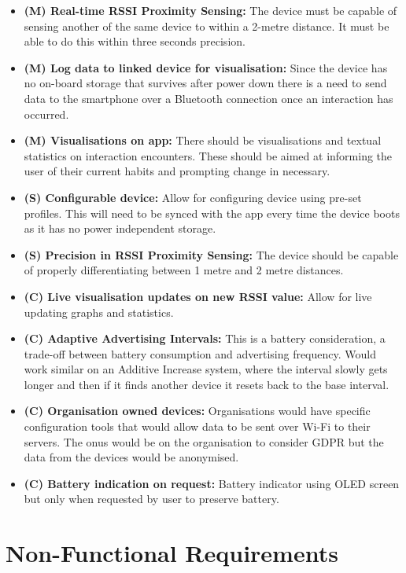 \documentclass{l4proj}
\begin{document}
\begin{itemize}
    \item \textbf{(M) Real-time RSSI Proximity Sensing: } The device must be capable of sensing another of the same device to within a 2-metre distance. It must be able to do this within three seconds precision.
    \item \textbf{(M) Log data to linked device for visualisation: } Since the device has no on-board storage that survives after power down there is a need to send data to the smartphone over a Bluetooth connection once an interaction has occurred.
    \item \textbf{(M) Visualisations on app: } There should be visualisations and textual statistics on interaction encounters. These should be aimed at informing the user of their current habits and prompting change in necessary.
    \item \textbf{(S) Configurable device: } Allow for configuring device using pre-set profiles. This will need to be synced with the app every time the device boots as it has no power independent storage.
    \item \textbf{(S) Precision in RSSI Proximity Sensing: } The device should be capable of properly differentiating between 1 metre and 2 metre distances.
    \item \textbf{(C) Live visualisation updates on new RSSI value: } Allow for live updating graphs and statistics.
    \item \textbf{(C) Adaptive Advertising Intervals: } This is a battery consideration, a trade-off between battery consumption and advertising frequency. Would work similar on an Additive Increase system, where the interval slowly gets longer and then if it finds another device it resets back to the base interval.
    \item \textbf{(C) Organisation owned devices: } Organisations would have specific configuration tools that would allow data to be sent over Wi-Fi to their servers. The onus would be on the organisation to consider GDPR but the data from the devices would be anonymised.
    \item \textbf{(C) Battery indication on request: } Battery indicator using OLED screen but only when requested by user to preserve battery.
\end{itemize}

\section{Non-Functional Requirements} \label{sec:non_func_requirements}
\end{document}
